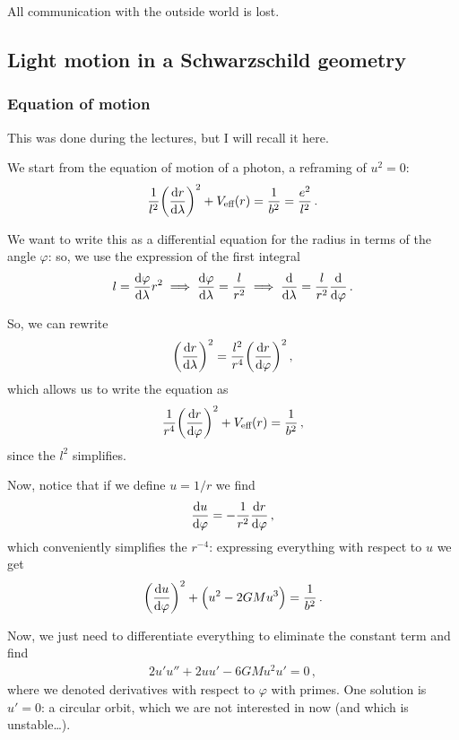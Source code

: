 \documentclass[main.tex]{subfiles}
\begin{document}
All communication with the outside world is lost. 

\subsection{Light motion in a Schwarzschild geometry}

\subsubsection{Equation of motion}

This was done during the lectures, but I will recall it here. 

We start from the equation of motion of a photon, a reframing of \(u^2=0\): 
%
\begin{align}
  \frac{1}{l^2} \qty(\dv{r}{\lambda })^2 + V _{\text{eff}} (r) = \frac{1}{b^2} = \frac{e^2}{l^2}
\,.
\end{align}

We want to write this as a differential equation for the radius in terms of the angle \(\varphi \): so, we use the expression of the first integral 
%
\begin{align}
  l = \dv{\varphi }{\lambda } r^2 \implies \dv{\varphi }{\lambda } = \frac{l}{r^2} \implies \dv{}{\lambda } = \frac{l}{r^2} \dv{}{\varphi }
\,.
\end{align}
%

So, we can rewrite 
%
\begin{align}
  \qty(\dv{r}{\lambda })^2= \frac{l^2}{r^{4}} \qty(\dv{r}{\varphi })^2
\,,
\end{align}
%
which allows us to write the equation as 
%
\begin{align}
  \frac{1}{r^{4}} \qty(\dv{r}{\varphi })^2 + V _{\text{eff}}(r) = \frac{1}{b^2}
\,,
\end{align}
%
since the \(l^2\) simplifies. 

Now, notice that if we define \(u = 1/r\) we find
%
\begin{align}
  \dv{u}{\varphi } = - \frac{1}{r^2} \dv{r}{\varphi }
\,,
\end{align}
%
which conveniently simplifies the \(r^{-4}\): expressing everything with respect to \(u\) we get 
%
\begin{align}
  \qty(\dv{u}{\varphi })^2 +  \qty(u^2-2GMu^3) = \frac{1}{b^2}
\,.
\end{align}

Now, we just need to differentiate everything to eliminate the constant term and find 
%
\begin{align}
  2 u' u'' + 2 u u' - 6 GM u^2 u' = 0
\,,
\end{align}
%
where we denoted derivatives with respect to \(\varphi \) with primes.
One solution is \(u'=0\): a circular orbit, which we are not interested in now (and which is unstable\dots).
\end{document}
